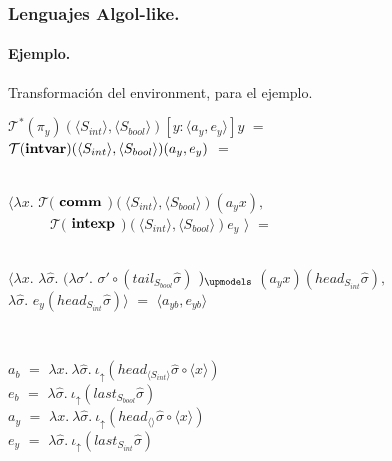 \documentclass{beamer} %
\newcommand{\angles}[1]{\langle #1 \rangle}
\newcommand{\T}{\mathcal{T}}
\newcommand{\intexp}{{\bf intexp}}
\newcommand{\intvar}{{\bf intvar}}
\newcommand{\comm}{\bf{comm}}
\newcommand{\iotabot}{\iota_{\uparrow}}
\newcommand{\sigmah}{\widehat{\sigma}}
\begin{document}
\begin{frame}
\frametitle{Lenguajes Algol-like.}
\framesubtitle{Ejemplo.}

\begin{block}{Transformaci\'on del environment, para el ejemplo.}

$\T^{*}(\pi_y)(\angles{S_{int}},\angles{S_{bool}})[y:\angles{a_y,e_y}]y$ $=$ \\
$\T(\intvar)(\angles{S_{int}},\angles{S_{bool}})(a_y,e_y)$ $=$\\
\

$\angles{\lambda x.$ $\T($ $\comm$ $)(\angles{S_{int}},\angles{S_{bool}})(a_y x),$ \\
\ \ \ \ \ \  $\T($ $\intexp$ $)(\angles{S_{int}},\angles{S_{bool}})e_y$ $}$ $=$ \\

\

$\angles {
\lambda x.$ $\lambda \sigmah .$ $(\lambda \sigma' .$ $\sigma' \circ (tail_{S_{bool}}\sigmah)$ $)_{\upmodels}$ $(a_y x)(head_{S_{int}}\sigmah),$ \\
$\lambda \sigmah .$ $e_y(head_{S_{int}}\sigmah)}$ $=$ $\angles{a_{yb},e_{yb}}$

\

$a_b$ $=$ $\lambda x. \ \lambda \sigmah . \ \iotabot(head_{\angles{S_{int}}}\sigmah \circ \angles{x})$\\
$e_b$ $=$ $\lambda \sigmah . \ \iotabot(last_{S_{bool}}\sigmah)$\\

$a_y$ $=$ $\lambda x. \ \lambda \sigmah . \ \iotabot(head_{\angles{}}\sigmah \circ \angles{x})$\\
$e_y$ $=$ $\lambda \sigmah . \ \iotabot(last_{S_{int}}\sigmah)$
\end{block}
\end{frame}
\end{document}
